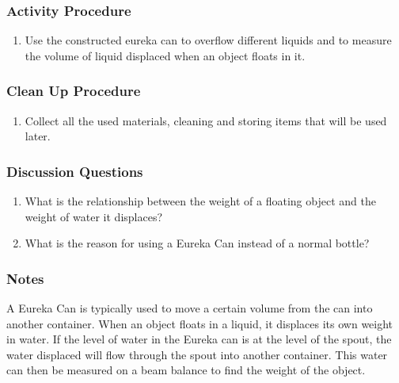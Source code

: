\subsubsection*{Activity Procedure}
\begin{enumerate}
\item{Use the constructed eureka can to overflow different liquids and to measure the volume of liquid displaced when an object floats in it.} 
\end{enumerate}

\subsubsection*{Clean Up Procedure}
\begin{enumerate}
\item{Collect all the used materials, cleaning and storing items that will be used later.} 
\end{enumerate}

\subsubsection*{Discussion Questions}
\begin{enumerate}
\item{What is the relationship between the weight of a floating object and the weight of water it displaces?}
\item{What is the reason for using a Eureka Can instead of a normal bottle?}
\end{enumerate}

\subsubsection*{Notes}
A Eureka Can is typically used to move a certain volume from the can into another container.  When an object floats in a liquid, it displaces its own weight in water.  If the level of water in the Eureka can is at the level of the spout, the water displaced will flow through the spout into another container.  This water can then be measured on a beam balance to find the weight of the object.
